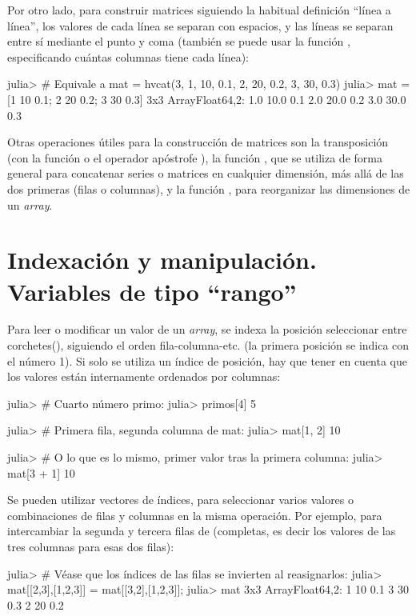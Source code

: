 Por otro lado, para construir matrices siguiendo la habitual definición ``línea a línea'', los valores de cada línea se separan con espacios, y las líneas se separan entre sí mediante el punto y coma (también se puede usar la función , especificando cuántas columnas tiene cada línea):

\begin{jlconcode}
julia> # Equivale a mat = hvcat(3, 1, 10, 0.1, 2, 20, 0.2, 3, 30, 0.3)
julia> mat = [1 10 0.1; 2 20 0.2; 3 30 0.3]
3x3 Array{Float64,2}:
 1.0 10.0 0.1
 2.0 20.0 0.2
 3.0 30.0 0.3
\end{jlconcode}

Otras operaciones útiles para la construcción de matrices son la transposición (con la función  o el operador apóstrofe ), la función , que se utiliza de forma general para concatenar series o matrices en cualquier dimensión, más allá de las dos primeras (filas o columnas), y la función , para reorganizar las dimensiones de un \emph{array}.


\section{Indexación y manipulación. Variables de tipo ``rango''}

Para leer o modificar un valor de un \emph{array}, se indexa la posición seleccionar entre corchetes(\code{[]}), siguiendo el orden fila-columna-etc. (la primera posición se indica con el número 1). Si solo se utiliza un índice de posición, hay que tener en cuenta que los valores están internamente ordenados por columnas:

\begin{jlconcode}
julia> # Cuarto número primo:
julia> primos[4]
5

julia> # Primera fila, segunda columna de mat:
julia> mat[1, 2]
10

julia> # O lo que es lo mismo, primer valor tras la primera columna:
julia> mat[3 + 1]
10
\end{jlconcode}

Se pueden utilizar vectores de índices, para seleccionar varios valores o combinaciones de filas y columnas en la misma operación. Por ejemplo, para intercambiar la segunda y tercera filas de  (completas, es decir los valores de las tres columnas para esas dos filas):

\begin{jlconcode}
julia> # Véase que los índices de las filas se invierten al reasignarlos:
julia> mat[[2,3],[1,2,3]] = mat[[3,2],[1,2,3]];
julia> mat
3x3 Array{Float64,2}:
 1 10 0.1
 3 30 0.3
 2 20 0.2
\end{jlconcode}

